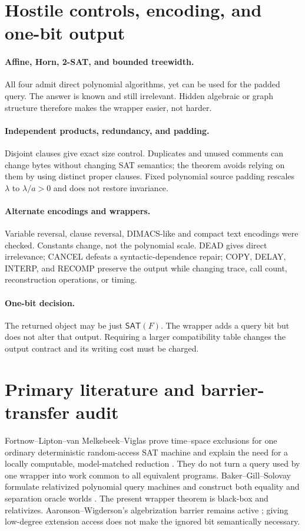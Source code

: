 \documentclass[11pt]{article}
\newcommand{\SAT}{\mathsf{SAT}}
\begin{document}
\section{Hostile controls, encoding, and one-bit output}

\paragraph{Affine, Horn, 2-SAT, and bounded treewidth.}
All four admit direct polynomial algorithms, yet can be used for the padded
query.  The answer is known and still irrelevant.  Hidden algebraic or graph
structure therefore makes the wrapper easier, not harder.

\paragraph{Independent products, redundancy, and padding.}
Disjoint clauses give exact size control.  Duplicates and unused comments can
change bytes without changing SAT semantics; the theorem avoids relying on
them by using distinct proper clauses.  Fixed polynomial source padding
rescales $\lambda$ to $\lambda/a>0$ and does not restore invariance.

\paragraph{Alternate encodings and wrappers.}
Variable reversal, clause reversal, DIMACS-like and compact text encodings
were checked.  Constants change, not the polynomial scale.  DEAD gives direct
irrelevance; CANCEL defeats a syntactic-dependence repair; COPY, DELAY,
INTERP, and RECOMP preserve the output while changing trace, call count,
reconstruction operations, or timing.

\paragraph{One-bit decision.}
The returned object may be just $\SAT(F)$.  The wrapper adds a query bit but
does not alter that output.  Requiring a larger compatibility table changes
the output contract and its writing cost must be charged.

\section{Primary literature and barrier-transfer audit}

Fortnow--Lipton--van Melkebeek--Viglas prove time--space exclusions for one
ordinary deterministic random-access SAT machine and explain the need for a
locally computable, model-matched reduction \cite{FLMV}.  They do not turn a
query used by one wrapper into work common to all equivalent programs.
Baker--Gill--Solovay formulate relativized polynomial query machines and
construct both equality and separation oracle worlds \cite{BGS}.  The present
wrapper theorem is black-box and relativizes.  Aaronson--Wigderson's
algebrization barrier remains active \cite{AW}; giving low-degree extension
access does not make the ignored bit semantically necessary.
\end{document}

